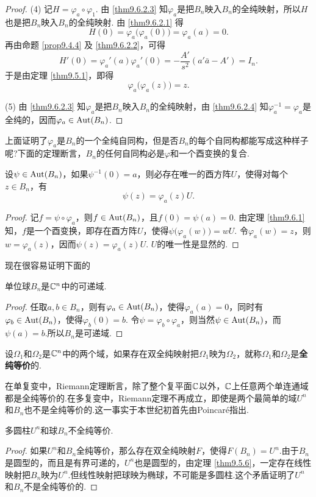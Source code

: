 \begin{proof}
(4) 记$H=\varphi_a\circ\varphi_1$. 由 \ref{thm9.6.2.3} 知$\varphi_a$是把$B_n$映入$B_n$的全纯映射，所以$H$也是把$B_n$映入$B_n$的全纯映射. 由 \ref{thm9.6.2.1} 得
\[H(0)=\varphi_a\big(\varphi_a(0)\big)=\varphi_a(a)=0.\]
再由命题 \ref{prop9.4.4} 及 \ref{thm9.6.2.2}，可得
\[H'(0)=\varphi_a'(a)\varphi_a'(0)=-\frac{A'}{s^2}(a'\bar a-A')=I_n.\]
于是由定理 \ref{thm9.5.1}，即得
\[\varphi_a\big(\varphi_a(z)\big)=z.\]

(5) 由 \ref{thm9.6.2.3} 知$\varphi_a$是把$B_n$映入$B_n$的全纯映射，由 \ref{thm9.6.2.4} 知$\varphi_a^{-1}=\varphi_a$是全纯的，因而$\varphi_a\in\operatorname{Aut}(B_n)$.
\end{proof}

上面证明了$\varphi_a$是$B_n$的一个全纯自同构，但是否$B_n$的每个自同构都能写成这种样子呢?下面的定理断言，$B_n$的任何自同构必是$\varphi$和一个酉变换的复合.
\begin{theorem}\label{thm9.6.3}
设$\psi\in\operatorname{Aut}(B_n)$，如果$\psi^{-1}(0)=a$，则必存在唯一的酉方阵$U$，使得对每个$z\in B_n$，有
\[\psi(z)=\varphi_a(z)U.\]
\end{theorem}
\begin{proof}
记$f=\psi\circ \varphi_a$，则$f\in\operatorname{Aut}(B_n)$，且$f(0)=\psi(a)=0$. 由定理 \ref{thm9.6.1} 知，$f$是一个酉变换，即存在酉方阵$U$，使得$\psi\big(\varphi_a(w)\big)=wU$. 令$\varphi_a(w)=z$，则$w=\varphi_a(z)$，因而$\psi(z)=\varphi_a(z)U$. $U$的唯一性是显然的.
\end{proof}

现在很容易证明下面的
\begin{theorem}\label{thm9.6.4}
单位球$B_n$是$\mathbb C^n$中的可递域.
\end{theorem}
\begin{proof}
任取$a,b\in B_n$，则有$\varphi_a\in\operatorname{Aut}(B_n)$，使得$\varphi_a(a)=0$，同时有$\varphi_b\in\operatorname{Aut}(B_n)$，使得$\varphi_b(0)=b$. 令$\psi=\varphi_b\circ\varphi_a$，则当然$\psi\in\operatorname{Aut}(B_n)$，而$\psi(a)=b$.所以$B_n$是可递域.
\end{proof}

\begin{definition}\label{def9.6.5}
设$\Omega_1$和$\Omega_2$是$\mathbb C^n$中的两个域，如果存在双全纯映射把$\Omega_1$映为$\Omega_2$，就称$\Omega_1$和$\Omega_2$是\textbf{全纯等价}的.
\end{definition}

在单复变中，Riemann定理断言，除了整个复平面$\mathbb C$以外，$\mathbb C$上任意两个单连通域都是全纯等价的.在多复变中，Riemann定理不再成立，即使是两个最简单的域$U^n$和$B_n$也不是全纯等价的.这一事实于本世纪初首先由Poincar\'e指出.
\begin{theorem}
多圆柱$U^n$和球$B_n$不全纯等价.
\end{theorem}
\begin{proof}
如果$U^n$和$B_n$全纯等价，那么存在双全纯映射$F$，使得$F(B_n)=U^n$.由于$B_n$是圆型的，而且是有界可递的，$U^n$也是圆型的，由定理 \ref{thm9.5.6}，一定存在线性映射把$B_n$映为$U^n$.但线性映射把球映为椭球，不可能是多圆柱.这个矛盾证明了$U^n$和$B_n$不是全纯等价的.
\end{proof}

